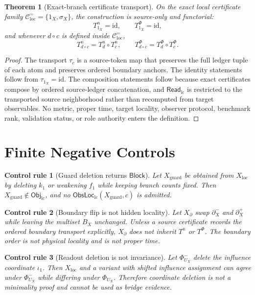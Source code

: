\documentclass[11pt]{article}
\newcommand{\ObjLC}{\mathsf{Obj}_{\mathrm{lc}}}
\newcommand{\ReadLC}{\mathsf{Read}_{\mathrm{lc}}}
\newcommand{\ObsLocLC}{\mathsf{ObsLoc}_{\mathrm{lc}}}
\newcommand{\Block}{\mathsf{Block}}
\newtheorem{theorem}{Theorem}
\newtheorem{controlrule}{Control rule}
\begin{document}
\begin{theorem}[Exact-branch certificate transport]
On the exact local certificate family
\(\mathcal{C}^{=}_{\mathrm{loc}}=\{1_X,\sigma_X\}\), the construction
is source-only and functorial:
\[
    T_{1_X}^n=\mathrm{id},\qquad T_{1_X}^{\Phi}=\mathrm{id},
\]
and whenever \(d\circ c\) is defined inside
\(\mathcal{C}^{=}_{\mathrm{loc}}\),
\[
    T_{d\circ c}^n=T_d^n\circ T_c^n,
    \qquad
    T_{d\circ c}^{\Phi}=T_d^\Phi\circ T_c^\Phi .
\]
\end{theorem}

\begin{proof}
The transport \(\tau_c\) is a source-token map that preserves the full
ledger tuple of each atom and preserves ordered boundary anchors. The
identity statements follow from \(\tau_{1_X}=\mathrm{id}\). The
composition statements follow because exact certificates compose by
ordered source-ledger concatenation, and \(\ReadLC\) is restricted to
the transported source neighborhood rather than recomputed from target
observables. No metric, proper time, target locality, observer
protocol, benchmark rank, validation status, or role authority enters
the definition.
\end{proof}

\section{Finite Negative Controls}

\begin{controlrule}[Guard deletion returns \(\Block\)]
Let \(X_{\mathrm{guard}}\) be obtained from \(X_{\mathrm{loc}}\) by
deleting \(k_1\) or weakening \(f_1\) while keeping branch counts
fixed. Then \(X_{\mathrm{guard}}\notin\ObjLC\), and no
\(\ObsLocLC(X_{\mathrm{guard}},c)\) is admitted.
\end{controlrule}

\begin{controlrule}[Boundary flip is not hidden locality]
Let \(X_{\partial}\) swap \(\partial^-_X\) and \(\partial^+_X\) while
leaving the multiset \(B_X\) unchanged. Unless a source certificate
records the ordered boundary transport explicitly, \(X_{\partial}\)
does not inherit \(T^n\) or \(T^\Phi\). The boundary order is not
physical locality and is not proper time.
\end{controlrule}

\begin{controlrule}[Readout deletion is not invariance]
Let \(\Phi^{-}_{U_X}\) delete the influence coordinate \(\iota_1\).
Then \(X_{\mathrm{loc}}\) and a variant with shifted influence
assignment can agree under \(\Phi^{-}_{U_X}\) while differing under
\(\Phi_{U_X}\). Therefore coordinate deletion is not a minimality
proof and cannot be used as bridge evidence.
\end{controlrule}
\end{document}
